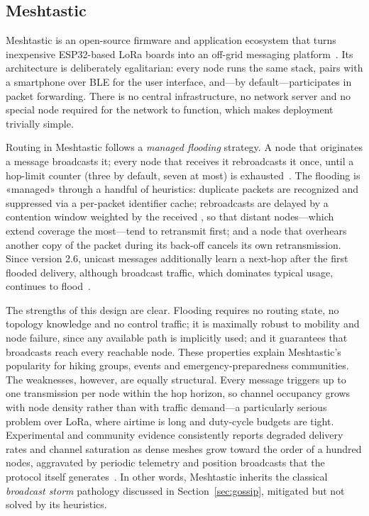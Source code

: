 \documentclass[english,bachelor]{tfgitic}[2026/01/22]
\begin{document}
\subsection{Meshtastic}
\label{subsec:meshtastic}

Meshtastic is an open-source firmware and application ecosystem that turns inexpensive ESP32-based LoRa boards into an off-grid messaging platform~\cite{meshtastic2024docs}. Its architecture is deliberately egalitarian: every node runs the same stack, pairs with a smartphone over BLE for the user interface, and---by default---participates in packet forwarding. There is no central infrastructure, no network server and no special node required for the network to function, which makes deployment trivially simple.

Routing in Meshtastic follows a \emph{managed flooding} strategy. A node that originates a message broadcasts it; every node that receives it rebroadcasts it once, until a hop-limit counter (three by default, seven at most) is exhausted~\cite{meshtastic2024mesh}. The flooding is «managed» through a handful of heuristics: duplicate packets are recognized and suppressed via a per-packet identifier cache; rebroadcasts are delayed by a contention window weighted by the received , so that distant nodes---which extend coverage the most---tend to retransmit first; and a node that overhears another copy of the packet during its back-off cancels its own retransmission. Since version 2.6, unicast messages additionally learn a next-hop after the first flooded delivery, although broadcast traffic, which dominates typical usage, continues to flood~\cite{meshtastic2024mesh}.

The strengths of this design are clear. Flooding requires no routing state, no topology knowledge and no control traffic; it is maximally robust to mobility and node failure, since any available path is implicitly used; and it guarantees that broadcasts reach every reachable node. These properties explain Meshtastic's popularity for hiking groups, events and emergency-preparedness communities. The weaknesses, however, are equally structural. Every message triggers up to one transmission per node within the hop horizon, so channel occupancy grows with node density rather than with traffic demand---a particularly serious problem over LoRa, where airtime is long and duty-cycle budgets are tight. Experimental and community evidence consistently reports degraded delivery rates and channel saturation as dense meshes grow toward the order of a hundred nodes, aggravated by periodic telemetry and position broadcasts that the protocol itself generates~\cite{wong2024multihop,meshtastic2024mesh}. In other words, Meshtastic inherits the classical \emph{broadcast storm} pathology discussed in Section~\ref{sec:gossip}, mitigated but not solved by its heuristics.
\end{document}
